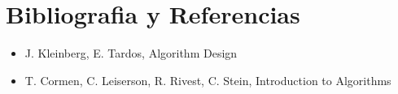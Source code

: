 \section{Bibliografia y Referencias}
\begin{itemize}
    \item J. Kleinberg, E. Tardos, Algorithm Design
    \item T. Cormen, C. Leiserson, R. Rivest, C. Stein, Introduction to Algorithms
\end{itemize}
